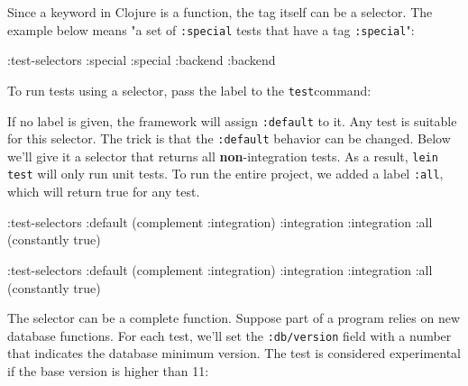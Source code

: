 Since a keyword in Clojure is a function, the tag itself can be a selector. The example below means "a set of \verb|:special| tests that have a tag \verb|:special|":

\begin{english}
  \begin{clojure}
:test-selectors {:special :special
                 :backend :backend}
  \end{clojure}
\end{english}

\noindent
To run tests using a selector, pass the label to the \verb|test|command:

\begin{english}
\end{english}


If no label is given, the framework will assign \verb|:default| to it. Any test is suitable for this selector. The trick is that the \verb|:default| behavior can be changed. Below we'll give it a selector that returns all \textbf{non}-integration tests. As a result, \verb|lein test| will only run unit tests. To run the entire project, we added a label \verb|:all|, which will return true for any test.

\ifnarrow

\begin{english}
  \begin{clojure}
:test-selectors
  {:default (complement :integration)
   :integration :integration
   :all (constantly true)}
  \end{clojure}
\end{english}

\else

\begin{english}
  \begin{clojure}
:test-selectors {:default (complement :integration)
                 :integration :integration
                 :all (constantly true)}
  \end{clojure}
\end{english}

\fi

The selector can be a complete function. Suppose part of a program relies on new database functions. For each test, we'll set the \verb|:db/version| field with a number that indicates the database minimum version. The test is considered experimental if the base version is higher than 11:

